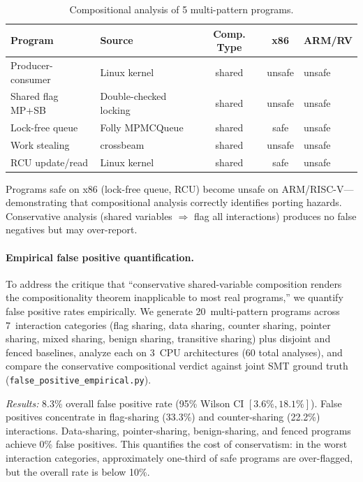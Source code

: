 \documentclass[11pt]{article}
\begin{document}
\begin{table}[ht]
\centering
\caption{Compositional analysis of 5 multi-pattern programs.}
\label{tab:compositional}
\small
\begin{tabular}{llccl}
\toprule
\textbf{Program} & \textbf{Source} & \textbf{Comp. Type} & \textbf{x86} & \textbf{ARM/RV} \\
\midrule
Producer-consumer & Linux kernel & shared & unsafe & unsafe \\
Shared flag MP+SB & Double-checked locking & shared & unsafe & unsafe \\
Lock-free queue & Folly MPMCQueue & shared & safe & unsafe \\
Work stealing & crossbeam & shared & unsafe & unsafe \\
RCU update/read & Linux kernel & shared & safe & unsafe \\
\bottomrule
\end{tabular}
\end{table}

\noindent
Programs safe on x86 (lock-free queue, RCU) become unsafe on ARM/RISC-V---demonstrating
that compositional analysis correctly identifies porting hazards.
Conservative analysis (shared variables $\Rightarrow$ flag all interactions)
produces no false negatives but may over-report.

\paragraph{Empirical false positive quantification.}
To address the critique that ``conservative shared-variable composition renders
the compositionality theorem inapplicable to most real programs,'' we
quantify false positive rates empirically.
We generate 20~multi-pattern programs across 7~interaction categories
(flag sharing, data sharing, counter sharing, pointer sharing, mixed sharing,
benign sharing, transitive sharing) plus disjoint and fenced baselines,
analyze each on 3~CPU architectures (60 total analyses), and compare the
conservative compositional verdict against joint SMT ground truth
(\texttt{false\_positive\_empirical.py}).

\emph{Results:} 8.3\% overall false positive rate
(95\% Wilson CI $[3.6\%, 18.1\%]$).
False positives concentrate in flag-sharing (33.3\%) and counter-sharing
(22.2\%) interactions.
Data-sharing, pointer-sharing, benign-sharing, and fenced programs
achieve 0\% false positives.
This quantifies the cost of conservatism: in the worst interaction
categories, approximately one-third of safe programs are over-flagged,
but the overall rate is below 10\%.
\end{document}
